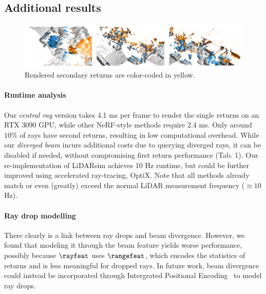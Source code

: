 \subsection{Additional results}
\label{sec:supp_results}

\begin{figure}[!t]
    \centering
        \includegraphics[width=0.8\columnwidth]{content/main/images/rebuttal_secondary_return.pdf}
        \caption{Rendered secondary returns are color-coded in {\setlength{\fboxsep}{0pt}\colorbox{sdpoints}{yellow}}.}
    \label{fig:rebuttal_second_return}
\end{figure}

\paragraph{Runtime analysis}
Our \textit{central ray} version takes 4.1 ms per frame to render the single returns on an RTX 3090 GPU, while other NeRF-style methods require 2.4 ms. Only around $10\%$ of rays have second returns, resulting in low computational overhead. While our \textit{diverged beam} incurs additional costs due to querying diverged rays, it can be disabled if needed, without compromising first return performance (\cf Tab. 1). Our re-implementation of LiDARsim achieves 10 Hz runtime, but could be further improved using accelerated ray-tracing, \eg OptiX. Note that all methods already match or even (greatly) exceed the normal LiDAR measurement frequency (${\approx}10$ Hz). 

\paragraph{Ray drop modelling}
There clearly is a link between ray drops and beam divergence. However, we found that modeling it through the beam feature yields worse performance, possibly because $\rayfeat$ uses $\rangefeat$, which encodes the statistics of returns and is less meaningful for dropped rays. In future work, beam divergence could instead be incorporated through Intergrated Positional Encoding~\cite{barron2023zipnerf} to model ray drops.

